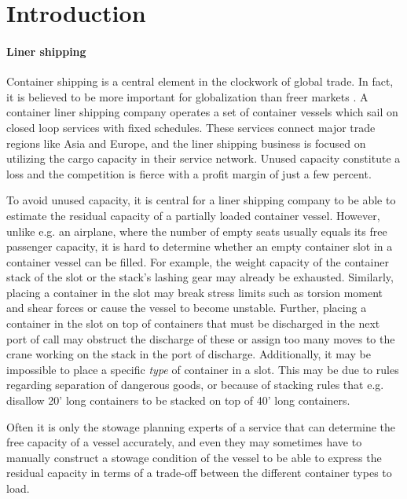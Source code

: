 %

%
\section{Introduction}
\paragraph{Liner shipping}
Container shipping is a central element in the clockwork of global trade. In fact, it is believed to be more important for globalization than freer markets \cite{EC13}. A container liner shipping company operates a set of container vessels which sail on closed loop services with fixed schedules. These services connect major trade regions like Asia and Europe, and the liner shipping business is focused on utilizing the cargo capacity in their service network. Unused capacity constitute a loss and the competition is fierce with a profit margin of just a few percent.  

To avoid unused capacity, it is central for a liner shipping company to be able to estimate the residual capacity of a partially loaded container vessel. However, unlike e.g. an airplane, where the number of empty seats usually equals its free passenger capacity, it is hard to determine whether an empty container slot in a container vessel can be filled. %
For example, the weight capacity of the container stack of the slot or the stack's lashing gear may already be exhausted. 
Similarly, placing a container in the slot may break stress limits such as torsion moment and shear forces or cause the vessel to become unstable.
Further, placing a container in the slot on top of containers that must be discharged in the next port of call may obstruct the discharge of these or assign too many moves to the crane working on the stack in the port of discharge. 
%
Additionally, it may be impossible to place a specific \emph{type} of container in a slot. This may be due to rules regarding separation of dangerous goods, or because of stacking rules that e.g. disallow 20' long containers to be stacked on top of 40' long containers. 

Often it is only the stowage planning experts of a service that can determine the free capacity of a vessel accurately, and even they may sometimes have to manually construct a stowage condition of the vessel to be able to express the residual capacity in terms of a trade-off between the different container types to load.

